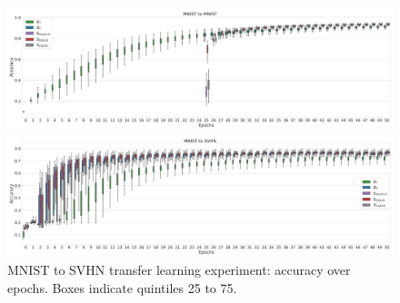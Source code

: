 
\begin{figure}[ht!]
\centering
\begin{minipage}[t]{0.42\textwidth}
\begin{center}
\includegraphics[angle=90,origin=c, trim=0in 0in 0in 0in, clip, width=1.00\linewidth]{figures/boxplots/MNIST_to_MNIST_boxplot.png}
\caption{MNIST in-dataset experiment: accuracy over epochs. 
Boxes indicate quintiles 25 to 75. }
\label{fig:sampling_boxplot_mnist_mnist}    
\end{center}
\end{minipage}
\hskip 2mm
\begin{minipage}[t]{0.42\textwidth}
\begin{center}
\includegraphics[angle=90,origin=c, trim=0in 0in 0in 0in, clip, width=1.00\linewidth]{figures/boxplots/MNIST_to_SVHN_boxplot.png}
\caption{MNIST to SVHN transfer learning experiment: accuracy over epochs. Boxes indicate quintiles 25 to 75. }
\label{fig:sampling_boxplot_mnist_svhn}    
\end{center}
\end{minipage}
\end{figure}



